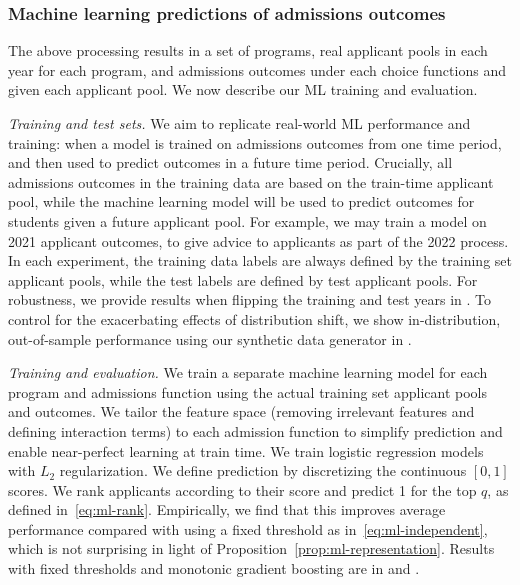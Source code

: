 \documentclass[letterpaper]{article}
\begin{document}
\subsubsection{Machine learning predictions of admissions outcomes}
The above processing results in a set of programs, real applicant pools in each year for each program, and admissions outcomes under each choice functions and given each applicant pool. We now describe our ML training and evaluation.

\textit{Training and test sets.} We aim to replicate real-world ML performance and training: when a model is trained on admissions outcomes from one time period, and then used to predict outcomes in a future time period. Crucially, all admissions outcomes in the training data are based on the train-time applicant pool, while the machine learning model will be used to predict outcomes for students given a future applicant pool. For example, we may train a model on 2021 applicant outcomes, to give advice to applicants as part of the 2022 process. In each experiment, the training data labels are always defined by the training set applicant pools, while the test labels are defined by test applicant pools. For robustness, we provide results when flipping the training and test years in . To control for the exacerbating effects of distribution shift, we show in-distribution, out-of-sample performance using our synthetic data generator in .

\textit{Training and evaluation.} We train a separate machine learning model for each program and admissions function using the actual training set applicant pools and outcomes.
We tailor the feature space  (removing irrelevant features and defining interaction terms) to each admission function to simplify prediction and enable near-perfect learning at train time. We train logistic regression models with $L_2$ regularization.
We define prediction by discretizing the continuous $[0,1]$ scores.
We rank applicants according to their score and predict 1 for the top $q$, as defined in~\eqref{eq:ml-rank}.
Empirically, we find that this improves average performance compared with using a fixed threshold as in~\eqref{eq:ml-independent}, which is not surprising in light of Proposition~\ref{prop:ml-representation}.
Results with fixed thresholds and monotonic gradient boosting are in  and .
\end{document}
